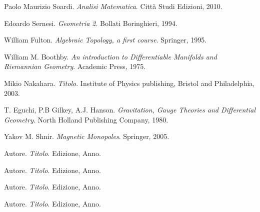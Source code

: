 \begin{thebibliography}{9}
   Paolo Maurizio Soardi.
   \textit{Analisi Matematica}.
   Città Studi Edizioni, 2010.

   Edoardo Sernesi.
   \textit{Geometria 2}.
   Bollati Boringhieri, 1994.

  William Fulton.
  \textit{Algebraic Topology, a first course}.
  Springer, 1995.

   William M. Boothby.
   \textit{An introduction to Differentiable Manifolds and Riemannian Geometry}.
   Academic Press, 1975.

   Mikio Nakahara.
   \textit{Titolo}.
   Institute of Physics publishing, Bristol and Philadelphia, 2003.

  T. Eguchi, P.B Gilkey, A.J. Hanson.
  \textit{Gravitation, Gauge Theories and Differential Geometry}.
  North Holland Publishing Company, 1980.

  Yakov M. Shnir.
  \textit{Magnetic Monopoles}.
  Springer, 2005.

   Autore.
   \textit{Titolo}.
   Edizione, Anno.

   Autore.
   \textit{Titolo}.
   Edizione, Anno.

  Autore.
  \textit{Titolo}.
  Edizione, Anno.

  Autore.
  \textit{Titolo}.
  Edizione, Anno.

\end{thebibliography}
